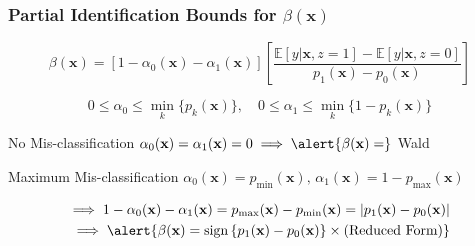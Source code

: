 \documentclass[handout]{beamer}
\begin{document}
\begin{frame}
  \frametitle{Partial Identification Bounds for $\beta(\mathbf{x})$}

    \footnotesize
    \[
      \boxed{ \beta(\mathbf{x}) = \left[ 1 - \alpha_0(\mathbf{x}) - \alpha_1(\mathbf{x}) \right] 
     \left[\frac{\mathbb{E}\left[y|\mathbf{x},z=1\right] - \mathbb{E}\left[y|\mathbf{x},z=0\right]}{p_1(\mathbf{x}) - p_0(\mathbf{x})}\right] }
    \]

    \footnotesize
    \[
      \boxed{ 0 \leq \alpha_0 \leq \min_k \{p_k(\mathbf{x})\}, \quad 0 \leq \alpha_1 \leq \min_k \{1 - p_k(\mathbf{x})\}}
    \]

    \normalsize
    \begin{block}{No Mis-classification}
      $\alpha_0(\mathbf{x}) =  \alpha_1(\mathbf{x}) = 0 \implies \alert{\beta(\mathbf{x}) = }$ \alert{Wald}
    \end{block}

    \begin{block}{Maximum Mis-classification}
      $\alpha_0(\mathbf{x}) = p_{\min}(\mathbf{x}), \, \alpha_1(\mathbf{x}) = 1 - p_{\max}(\mathbf{x})$

      \vspace{-0.5em}
      \begin{align*}
        \implies 1 - \alpha_0(\mathbf{x}) - \alpha_1(\mathbf{x}) = p_{\max}(\mathbf{x}) - p_{\min}(\mathbf{x})
      = |p_1(\mathbf{x}) - p_0(\mathbf{x})|\\
      \implies \alert{\beta(\mathbf{x}) =\mbox{sign}\left\{ p_1(\mathbf{x}) - p_0(\mathbf{x}) \right\}\times (\mbox{Reduced Form})}
    \end{align*}
      
    \end{block}
  
    \hyperlink{BOUNDS_BODY}{}
\end{frame}
\end{document}
